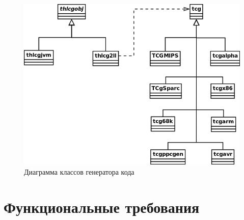 \documentclass{imcs}
\begin{document}
\begin{figure}[htb]
\centering
\includegraphics[width=\textwidth]{./uml/cgen.png}
\caption{Диаграмма классов генератора кода}
\end{figure}

\pagebreak

\section{Функциональные требования}
\end{document}
